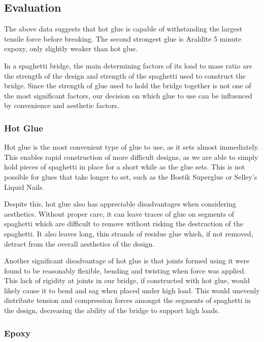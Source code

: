 \documentclass[a4paper,11pt]{article}
\begin{document}
\subsection{Evaluation}

The above data suggests that hot glue is capable of withstanding the largest
tensile force before breaking.
The second strongest glue is Araldite 5 minute expoxy, only slightly weaker
than hot glue.

In a spaghetti bridge, the main determining factors of its load to mass ratio
are the strength of the design and strength of the spaghetti used to construct
the bridge.
Since the strength of glue used to hold the bridge together is not one of the
most significant factors, our decision on which glue to use can be influenced
by convenience and aesthetic factors.


\subsubsection{Hot Glue}

Hot glue is the most convenient type of glue to use, as it sets almost
immediately.
This enables rapid construction of more difficult designs, as we are able to
simply hold pieces of spaghetti in place for a short while as the glue sets.
This is not possible for glues that take longer to set, such as the Bostik
Superglue or Selley's Liquid Nails.

Despite this, hot glue also has appreciable disadvantages when considering
aesthetics.
Without proper care, it can leave traces of glue on segments of spaghetti which
are difficult to remove without risking the destruction of the spaghetti.
It also leaves long, thin strands of residue glue which, if not removed,
detract from the overall aesthetics of the design.

Another significant disadvantage of hot glue is that joints formed using it were
found to be reasonably flexible, bending and twisting when force was applied.
This lack of rigidity at joints in our bridge, if constructed with hot glue,
would likely cause it to bend and sag when placed under high load.
This would unevenly distribute tension and compression forces amongst the
segments of spaghetti in the design, decreasing the ability of the bridge to
support high loads.


\subsubsection{Epoxy}
\end{document}
